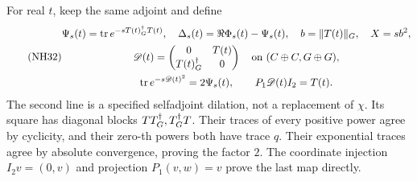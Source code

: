 \documentclass[11pt]{article}
\begin{document}
For real \(t\), keep the same adjoint and define
\begin{equation}\tag{NH32}\label{nhp:NH32}
\begin{gathered}
\Psi_s(t)=\operatorname{tr} e^{-sT(t)^\dagger_G T(t)},\quad
\Delta_s(t)=\Re\Phi_s(t)-\Psi_s(t),\quad
b=\|T(t)\|_G,\quad X=sb^2,\\
\mathscr D(t)=\begin{pmatrix}0&T(t)\\T(t)^\dagger_G&0\end{pmatrix}
\quad\hbox{on }(C\oplus C,G\oplus G),\\
\operatorname{tr} e^{-s\mathscr D(t)^2}=2\Psi_s(t),\qquad
P_1\mathscr D(t)I_2=T(t).
\end{gathered}
\end{equation}
The second line is a specified selfadjoint dilation, not
a replacement of \(\chi\). Its square has diagonal
blocks \(TT^\dagger_G,T^\dagger_G T\). Their traces of every positive
power agree by cyclicity, and their zero-th powers both
have trace \(q\). Their exponential traces agree by
absolute convergence, proving the factor \(2\).
The coordinate injection \(I_2v=(0,v)\) and projection
\(P_1(v,w)=v\) prove the last map directly.
\end{document}
